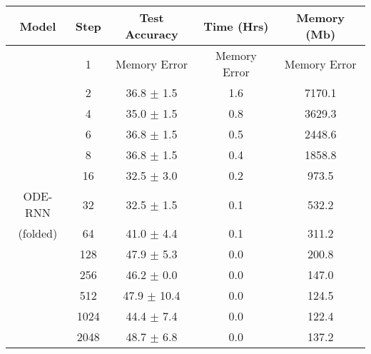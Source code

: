 \documentclass{article}
\begin{document}
\begin{table*}[t]
    \small
    \begin{center}
        \begin{tabular}{ccccc}
        \toprule
        \textbf{Model} & \textbf{Step} & \textbf{Test Accuracy} & \textbf{Time (Hrs)} & \textbf{Memory (Mb)} \\
        \midrule
          & 1    &  Memory Error & Memory Error & Memory Error \\
          & 2    &   36.8 $\pm$ 1.5 &           1.6 &        7170.1 \\
          & 4    &   35.0 $\pm$ 1.5 &           0.8 &        3629.3 \\
          & 6    &   36.8 $\pm$ 1.5 &           0.5 &        2448.6 \\
          & 8    &   36.8 $\pm$ 1.5 &           0.4 &        1858.8 \\
          & 16   &   32.5 $\pm$ 3.0 &           0.2 &         973.5 \\
        ODE-RNN  & 32   &   32.5 $\pm$ 1.5 &           0.1 &         532.2 \\
        (folded)  & 64   &   41.0 $\pm$ 4.4 &           0.1 &         311.2 \\
          & 128  &   47.9 $\pm$ 5.3 &           0.0 &         200.8 \\
          & 256  &   46.2 $\pm$ 0.0 &           0.0 &         147.0 \\
          & 512  &  47.9 $\pm$ 10.4 &           0.0 &         124.5 \\
          & 1024 &   44.4 $\pm$ 7.4 &           0.0 &         122.4 \\
          & 2048 &   48.7 $\pm$ 6.8 &           0.0 &         137.2 \\
        

\end{tabular}
\end{center}
\end{table*}
\end{document}

